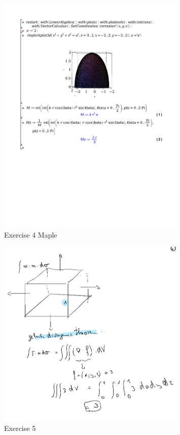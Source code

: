 \documentclass[a4paper]{report}
\begin{document}
\begin{figure}[H]
	\centering
	\includegraphics[width=0.8\textwidth]{exercises/huis_7_ex_4.pdf}
	\caption{Exercise 4 Maple}
\end{figure}

\begin{figure}[H]
	\centering
	\includegraphics[width=0.8\textwidth]{assets/huis_7_ex_5.png}
	\caption{Exercise 5}
	\label{fig:huis_7_ex_5}
\end{figure}
\end{document}

